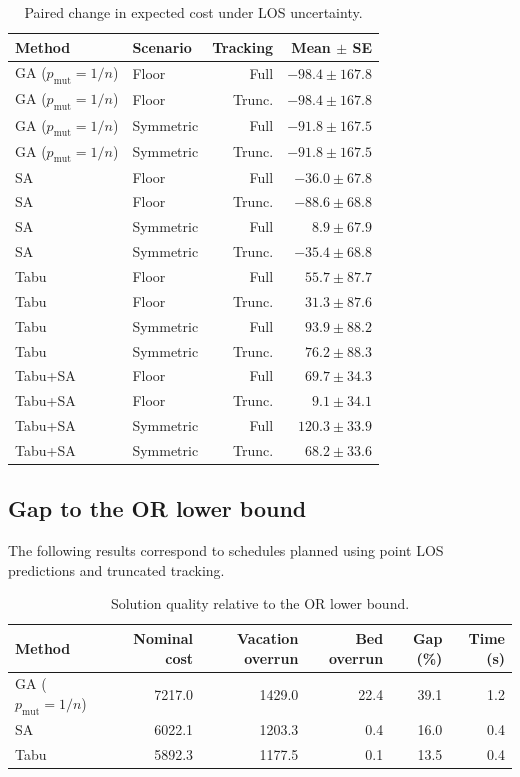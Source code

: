 \documentclass[11pt,a4paper]{article}
\begin{document}
\begin{table}[htbp]
\centering
\caption{Paired change in expected cost under LOS uncertainty.}
\label{tab:terminal-paired-change}
\small
\begin{tabular}{llrr}
\hline
Method & Scenario & Tracking & Mean $\pm$ SE \\
\hline
GA ($p_{\mathrm{mut}}=1/n$) & Floor
    & Full  & $-98.4 \pm 167.8$ \\
GA ($p_{\mathrm{mut}}=1/n$) & Floor
    & Trunc. & $-98.4 \pm 167.8$ \\
GA ($p_{\mathrm{mut}}=1/n$) & Symmetric
    & Full  & $-91.8 \pm 167.5$ \\
GA ($p_{\mathrm{mut}}=1/n$) & Symmetric
    & Trunc. & $-91.8 \pm 167.5$ \\
\hline
SA & Floor      & Full   & $-36.0 \pm 67.8$ \\
SA & Floor      & Trunc. & $-88.6 \pm 68.8$ \\
SA & Symmetric  & Full   & $  8.9 \pm 67.9$ \\
SA & Symmetric  & Trunc. & $-35.4 \pm 68.8$ \\
\hline
Tabu & Floor      & Full   & $55.7 \pm 87.7$ \\
Tabu & Floor      & Trunc. & $31.3 \pm 87.6$ \\
Tabu & Symmetric  & Full   & $93.9 \pm 88.2$ \\
Tabu & Symmetric  & Trunc. & $76.2 \pm 88.3$ \\
\hline
Tabu+SA & Floor      & Full   & $69.7 \pm 34.3$ \\
Tabu+SA & Floor      & Trunc. & $9.1 \pm 34.1$ \\
Tabu+SA & Symmetric  & Full   & $120.3 \pm 33.9$ \\
Tabu+SA & Symmetric  & Trunc. & $68.2 \pm 33.6$ \\
\hline
\end{tabular}
\end{table}

\subsection{Gap to the OR lower bound}

The following results correspond to schedules planned using point LOS
predictions and truncated tracking.

\begin{table}[htbp]
\centering
\caption{Solution quality relative to the OR lower bound.}
\label{tab:terminal-lower-bound}
\small
\begin{tabular}{lrrrrr}
\hline
Method & Nominal cost & Vacation overrun
       & Bed overrun & Gap (\%) & Time (s) \\
\hline
GA ($p_{\mathrm{mut}}=1/n$)
    & 7217.0 & 1429.0 & 22.4 & 39.1 & 1.2 \\
SA
    & 6022.1 & 1203.3 & 0.4 & 16.0 & 0.4 \\
Tabu
    & 5892.3 & 1177.5 & 0.1 & 13.5 & 0.4 \\
\hline
\end{tabular}
\end{table}
\end{document}
